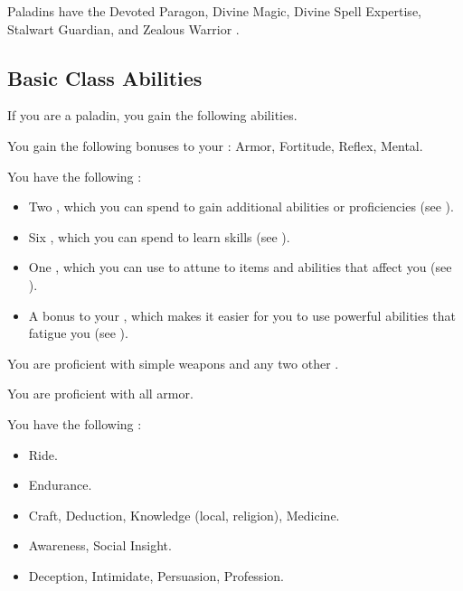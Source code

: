      Paladins have the Devoted Paragon, Divine Magic, Divine Spell Expertise, Stalwart Guardian, and Zealous Warrior .

    \subsection{Basic Class Abilities}
        If you are a paladin, you gain the following abilities.

        You gain the following bonuses to your :  Armor,  Fortitude,  Reflex,  Mental.

         You have the following :
        \begin{itemize}
            \item Two , which you can spend to gain additional abilities or proficiencies (see ).
            \item Six , which you can spend to learn skills (see ).
            \item One , which you can use to attune to items and abilities that affect you (see ).
            \item A  bonus to your , which makes it easier for you to use powerful abilities that fatigue you (see ).
        \end{itemize}

        You are proficient with simple weapons and any two other .

        You are proficient with all armor.

        You have the following :
        \begin{itemize}
            \item {} Ride.
            \item {} Endurance.
            \item {} Craft, Deduction, Knowledge (local, religion), Medicine.
            \item {} Awareness, Social Insight.
            \item {} Deception, Intimidate, Persuasion, Profession.
        \end{itemize}

